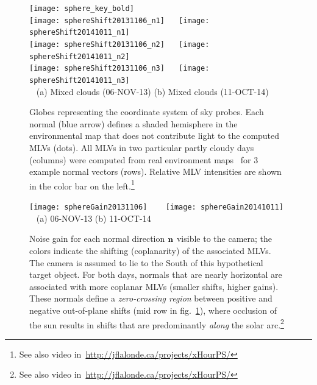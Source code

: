 \begin{figure}[t]
\centering
\hspace{3.1cm} \texttt{[image: sphere\_key\_bold]} \\[-1mm]
\texttt{[image: sphereShift20131106\_n1]} \ \ %
\texttt{[image: sphereShift20141011\_n1]} \\[3mm]
\texttt{[image: sphereShift20131106\_n2]} \ \ %
\texttt{[image: sphereShift20141011\_n2]} \\[3mm]
\texttt{[image: sphereShift20131106\_n3]} \ \ %
\texttt{[image: sphereShift20141011\_n3]} \\[2mm]
{\footnotesize {\verb| |} \hspace{0.5cm} (a) Mixed clouds (06-NOV-13) \hspace{0.25cm} (b) Mixed clouds (11-OCT-14) }\\
\caption[Examples of mean light vectors in function of the normal studied]{Globes representing the coordinate system of sky probes. Each normal (blue arrow) defines a shaded hemisphere in the environmental map that does not contribute light to the computed MLVs (dots). All MLVs in two particular partly cloudy days (columns) were computed from real environment maps~\cite{holdgeoffroy-iccp-15} for 3 example normal vectors (rows). Relative MLV intensities are shown in the color bar on the left.\footnote{See also video in~\url{http://jflalonde.ca/projects/xHourPS/}}}
\label{fig:realShiftNormal}
\end{figure}
\begin{figure}[!ht]
\centering
\texttt{[image: sphereGain20131106]} \ \ \ %
\texttt{[image: sphereGain20141011]} \\[1mm]
{\footnotesize {\verb| |} \hspace{.6cm} (a) 06-NOV-13 \hspace{1cm} (b) 11-OCT-14 }\\[3mm]
\caption[Noise gain over the sphere]{Noise gain for each normal direction ${\bf n}$ visible to the camera; the colors indicate the shifting (coplanarity) of the associated MLVs. The camera is assumed to lie to the South of this hypothetical target object. For both days, normals that are nearly horizontal are associated with more coplanar MLVs (smaller shifts, higher gains). These normals define a {\em zero-crossing region} between positive and negative out-of-plane shifts (mid row in fig.~\ref{fig:realShiftNormal}), where occlusion of the sun results in shifts that are predominantly {\em along} the solar arc.\footnote{See also video in~\url{http://jflalonde.ca/projects/xHourPS/}}}
\label{fig:realShiftAll}
\end{figure}


